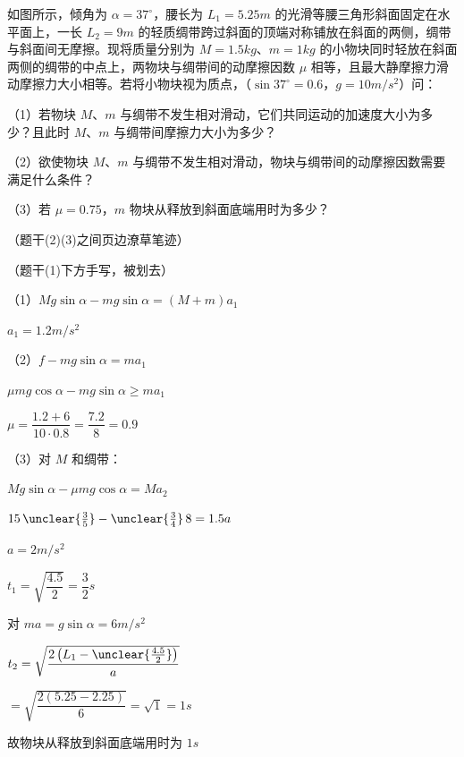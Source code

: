 \begin{problem}[21.（2+2+4=8）]
如图所示，倾角为 $\alpha=37^\circ$，腰长为 $L_1=5.25\unit{m}$ 的光滑等腰三角形斜面固定在水平面上，一长 $L_2=9\unit{m}$ 的轻质绸带跨过斜面的顶端对称铺放在斜面的两侧，绸带与斜面间无摩擦。现将质量分别为 $M=1.5\unit{kg}$、$m=1\unit{kg}$ 的小物块同时轻放在斜面两侧的绸带的中点上，两物块与绸带间的动摩擦因数 $\mu$ 相等，且最大静摩擦力滑动摩擦力大小相等。若将小物块视为质点，（$\sin37^\circ=0.6$，$g=10\unit{m/s^2}$）问：%

（1）若物块 $M$、$m$ 与绸带不发生相对滑动，它们共同运动的加速度大小为多少？且此时 $M$、$m$ 与绸带间摩擦力大小为多少？

（2）欲使物块 $M$、$m$ 与绸带不发生相对滑动，物块与绸带间的动摩擦因数需要满足什么条件？

（3）若 $\mu=0.75$，$m$ 物块从释放到斜面底端用时为多少？

（题干(2)(3)之间页边潦草笔迹）


\begin{solution}
（题干(1)下方手写，被划去）

（1）$Mg\sin\alpha-mg\sin\alpha=(M+m)a_1$

\hspace{1.6em}$a_1=1.2\unit{m/s^2}$

（2）$f-mg\sin\alpha=ma_1$

\hspace{1.6em}$\mu mg\cos\alpha-mg\sin\alpha\ge ma_1$

\hspace{1.6em}$\mu=\dfrac{1.2+6}{10\cdot0.8}=\dfrac{7.2}{8}=0.9$%

（3）对 $M$ 和绸带：

\hspace{1.6em}$Mg\sin\alpha-\mu mg\cos\alpha=Ma_2$

\hspace{1.6em}$15\,\unclear{\frac{3}{5}}-\unclear{\frac{3}{4}}\,8=1.5a$%

\hspace{1.6em}$a=2\unit{m/s^2}$

\hspace{1.6em}$t_1=\sqrt{\dfrac{4.5}{2}}=\dfrac{3}{2}\unit{s}$%

对 $m$\quad $a=g\sin\alpha=6\unit{m/s^2}$

\hspace{1.6em}$t_2=\sqrt{\dfrac{2\left(L_1-\unclear{\frac{4.5}{2}}\right)}{a}}$

\hspace{1.6em}$=\sqrt{\dfrac{2(5.25-2.25)}{6}}=\sqrt{1}=1\unit{s}$

故物块从释放到斜面底端用时为 $1\unit{s}$%
\end{solution}
\end{problem}
